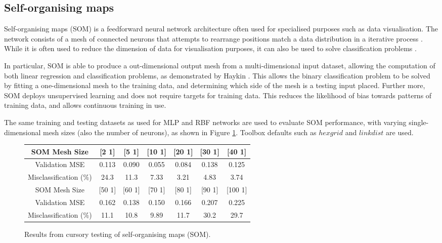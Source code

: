 \documentclass[10pt, oneside]{article}
\begin{document}
\subsection{Self-organising maps}

Self-organising maps (SOM) is a feedforward neural network architecture often used for specialised purposes such as data visualisation. The network consists of a mesh of connected neurons that attempts to rearrange positions match a data distribution in a iterative process \cite[p. 34]{som-lecture}. While it is often used to reduce the dimension of data for visualisation purposes, it can also be used to solve classification problems \cite{owens2000application}. 

In particular, SOM is able to produce a out-dimensional output mesh from a multi-dimensional input dataset, allowing the computation of both linear regression and classification problems, as demonstrated by Haykin \cite[Sec. 9.5]{haykin2008}. This allows the binary classification problem to be solved by fitting a one-dimensional mesh to the training data, and determining which side of the mesh is a testing input placed. Further more, SOM deploys unsupervised learning and does not require targets for training data. This reduces the likelihood of bias towards patterns of training data, and allows continuous training in use.

The same training and testing datasets as used for MLP and RBF networks are used to evaluate SOM performance, with varying single-dimensional mesh sizes (also the number of neurons), as shown in Figure \ref{fig:som-testing}. Toolbox defaults such as $hexgrid$ and $linkdist$ are used.

\begin{figure}[h]
\begin{center}
\fontsize{9}{11}\selectfont
\begin{tabular}{|c|c|c|c|c|c|c|}
\hline 
SOM Mesh Size & [2 1] & [5 1] & [10 1] & [20 1] & [30 1] & [40 1] \\ \hline 
Validation MSE & 0.113 & 0.090 & 0.055 & 0.084 & 0.138 & 0.125 \\ \hline 
Misclassification (\%) & 24.3 & 11.3 & 7.33 & 3.21 & 4.83 & 3.74 \\ \hline \hline 
SOM Mesh Size & [50 1] & [60 1] & [70 1] & [80 1] & [90 1] & [100 1] \\ \hline 
Validation MSE & 0.162 & 0.138 & 0.150 & 0.166 & 0.207 & 0.225 \\ \hline 
Misclassification (\%) & 11.1 & 10.8 & 9.89 & 11.7 & 30.2 & 29.7 \\ \hline 
\end{tabular}
\end{center}
\caption{\label{fig:som-testing} Results from cursory testing of self-organising maps  (SOM).}
\end{figure}
\end{document}
